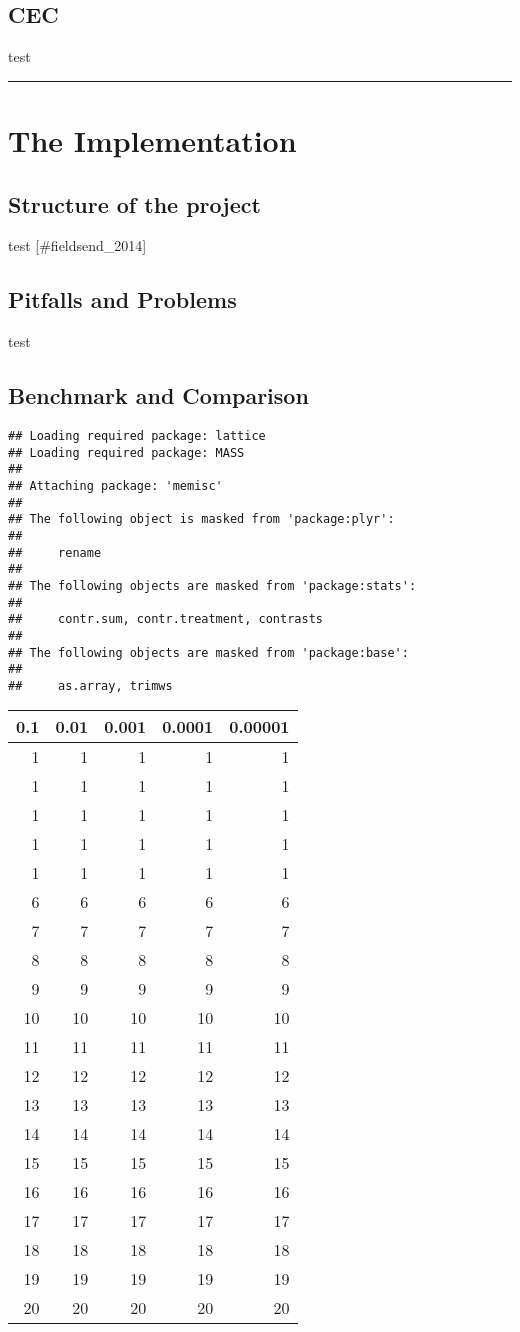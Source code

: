 \documentclass[12pt,a4paper]{article}
\begin{document}
\subsection{CEC}\label{cec}

test

\begin{center}\rule{0.5\linewidth}{\linethickness}\end{center}

\section{The Implementation}\label{the-implementation}

\subsection{Structure of the project}\label{structure-of-the-project}

test {[}\#fieldsend\_2014{]}

\subsection{Pitfalls and Problems}\label{pitfalls-and-problems}

test

\subsection{Benchmark and Comparison}\label{benchmark-and-comparison}

\begin{verbatim}
## Loading required package: lattice
## Loading required package: MASS
## 
## Attaching package: 'memisc'
## 
## The following object is masked from 'package:plyr':
## 
##     rename
## 
## The following objects are masked from 'package:stats':
## 
##     contr.sum, contr.treatment, contrasts
## 
## The following objects are masked from 'package:base':
## 
##     as.array, trimws
\end{verbatim}

\begin{longtable}[c]{@{}rrrrr@{}}
\toprule
0.1 & 0.01 & 0.001 & 0.0001 & 0.00001\tabularnewline
\midrule
\endhead
1 & 1 & 1 & 1 & 1\tabularnewline
1 & 1 & 1 & 1 & 1\tabularnewline
1 & 1 & 1 & 1 & 1\tabularnewline
1 & 1 & 1 & 1 & 1\tabularnewline
1 & 1 & 1 & 1 & 1\tabularnewline
6 & 6 & 6 & 6 & 6\tabularnewline
7 & 7 & 7 & 7 & 7\tabularnewline
8 & 8 & 8 & 8 & 8\tabularnewline
9 & 9 & 9 & 9 & 9\tabularnewline
10 & 10 & 10 & 10 & 10\tabularnewline
11 & 11 & 11 & 11 & 11\tabularnewline
12 & 12 & 12 & 12 & 12\tabularnewline
13 & 13 & 13 & 13 & 13\tabularnewline
14 & 14 & 14 & 14 & 14\tabularnewline
15 & 15 & 15 & 15 & 15\tabularnewline
16 & 16 & 16 & 16 & 16\tabularnewline
17 & 17 & 17 & 17 & 17\tabularnewline
18 & 18 & 18 & 18 & 18\tabularnewline
19 & 19 & 19 & 19 & 19\tabularnewline
20 & 20 & 20 & 20 & 20\tabularnewline
\bottomrule
\end{longtable}
\end{document}
